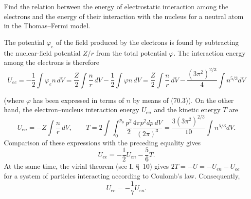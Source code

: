 \ProblemHeading
Find the relation between the energy of electrostatic interaction among the electrons and the energy of their interaction with the nucleus for a neutral atom in the Thomas--Fermi model.

\SolutionHeading The potential $\varphi_e$ of the field produced by the electrons is found by subtracting the nuclear-field potential $Z/r$ from the total potential $\varphi$. The interaction energy among the electrons is therefore
\[
 U_{ee}=-\frac12\int\varphi_en\,dV=\frac Z2\int\frac nr\,dV-\frac12\int\varphi n\,dV
 =\frac Z2\int\frac nr\,dV-\frac{(3\pi^2)^{2/3}}4\int n^{5/3}dV
\]

(where $\varphi$ has been expressed in terms of $n$ by means of (70.3)). On the other hand, the electron--nucleus interaction energy $U_{en}$ and the kinetic energy $T$ are
\[
 U_{en}=-Z\int\frac nr\,dV,\qquad T=2\int\!\int_0^{p_0}\frac{p^2}{2}\frac{4\pi p^2dp\,dV}{(2\pi)^3}=\frac{3(3\pi^2)^{2/3}}{10}\int n^{5/3}dV.
\]
Comparison of these expressions with the preceding equality gives
\[U_{ee}=-\frac12U_{en}-\frac56T.\]
At the same time, the virial theorem (see I, \S~10) gives $2T=-U=-U_{en}-U_{ee}$ for a system of particles interacting according to Coulomb's law. Consequently,
\[U_{ee}=-\frac17U_{en}.\]
